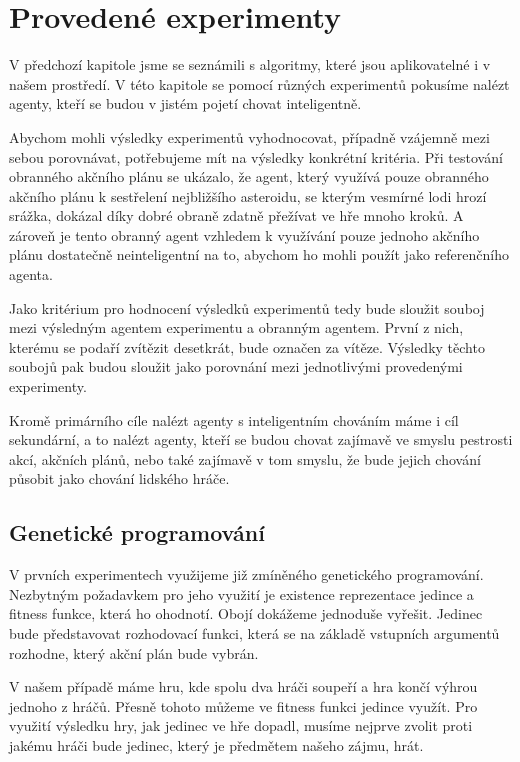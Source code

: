 \chapter{Provedené experimenty}
V předchozí kapitole jsme se seznámili s algoritmy, které jsou aplikovatelné i v našem prostředí.
V této kapitole se pomocí různých experimentů pokusíme nalézt agenty, kteří se budou v jistém pojetí chovat inteligentně.

Abychom mohli výsledky experimentů vyhodnocovat, případně vzájemně mezi sebou porovnávat, potřebujeme mít na výsledky konkrétní kritéria.
Při testování obranného akčního plánu se ukázalo, že agent, který využívá pouze obranného akčního plánu k sestřelení nejbližšího asteroidu, se kterým vesmírné lodi hrozí srážka, dokázal díky dobré obraně zdatně přežívat ve hře mnoho kroků.
A zároveň je tento obranný agent vzhledem k využívání pouze jednoho akčního plánu dostatečně neinteligentní na to, abychom ho mohli použít jako referenčního agenta.

Jako kritérium pro hodnocení výsledků experimentů tedy bude sloužit souboj mezi výsledným agentem experimentu a obranným agentem.
První z nich, kterému se podaří zvítězit desetkrát, bude označen za vítěze. Výsledky těchto soubojů pak budou sloužit jako porovnání mezi jednotlivými provedenými experimenty.

Kromě primárního cíle nalézt agenty s inteligentním chováním máme i cíl sekundární, a to nalézt agenty, kteří se budou chovat zajímavě ve smyslu pestrosti akcí, akčních plánů, nebo také zajímavě v tom smyslu, že bude jejich chování působit jako chování lidského hráče.

\section{Genetické programování}
V prvních experimentech využijeme již zmíněného genetického programování. Nezbytným požadavkem pro jeho využití je existence reprezentace jedince a fitness funkce, která ho ohodnotí. 
Obojí dokážeme jednoduše vyřešit.
Jedinec bude představovat rozhodovací funkci, která se na základě vstupních argumentů rozhodne, který akční plán bude vybrán.

V našem případě máme hru, kde spolu dva hráči soupeří a hra končí výhrou jednoho z hráčů.
Přesně tohoto můžeme ve fitness funkci jedince využít. 
Pro využití výsledku hry, jak jedinec ve hře dopadl, musíme nejprve zvolit proti jakému hráči bude jedinec, který je předmětem našeho zájmu, hrát.


